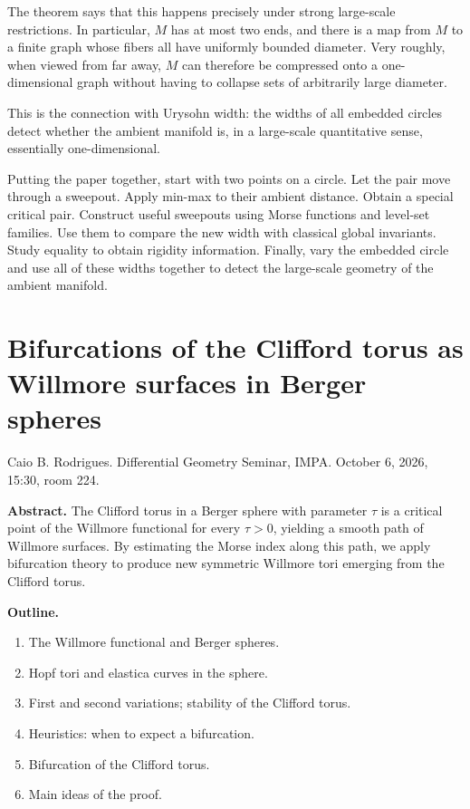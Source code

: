 The theorem says that this happens precisely
under strong large-scale restrictions. In
particular, $M$ has at most two ends, and
there is a map from $M$ to a finite graph
whose fibers all have uniformly bounded
diameter. Very roughly, when viewed from far
away, $M$ can therefore be compressed onto a
one-dimensional graph without having to
collapse sets of arbitrarily large diameter.

This is the connection with Urysohn width:
the widths of all embedded circles detect
whether the ambient manifold is, in a
large-scale quantitative sense, essentially
one-dimensional.

\medskip\noindent
Putting the paper together, start with two
points on a circle. Let the pair move through
a sweepout. Apply min-max to their ambient
distance. Obtain a special critical pair.
Construct useful sweepouts using Morse
functions and level-set families. Use them to
compare the new width with classical global
invariants. Study equality to obtain rigidity
information. Finally, vary the embedded
circle and use all of these widths together
to detect the large-scale geometry of the
ambient manifold.



\section{Bifurcations of the Clifford torus as
Willmore surfaces in Berger spheres}
\label{section-caio-rodrigues-willmore-berger}

\noindent
Caio B. Rodrigues.
Differential Geometry Seminar, IMPA.
October 6, 2026, 15:30, room 224.

\medskip\noindent
{\bf Abstract.}
The Clifford torus in a Berger sphere with
parameter $\tau$ is a critical point of the
Willmore functional for every $\tau>0$,
yielding a smooth path of Willmore surfaces.
By estimating the Morse index along this
path, we apply bifurcation theory to produce
new symmetric Willmore tori emerging from
the Clifford torus.

\medskip\noindent
{\bf Outline.}
\begin{enumerate}
\item The Willmore functional and Berger
spheres.
\item Hopf tori and elastica curves in the
sphere.
\item First and second variations; stability
of the Clifford torus.
\item Heuristics: when to expect a
bifurcation.
\item Bifurcation of the Clifford torus.
\item Main ideas of the proof.
\end{enumerate}




